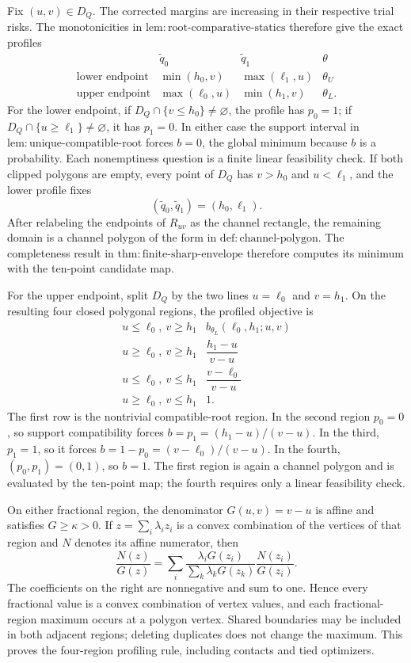 Fix \((u,v)\in D_Q\). The corrected margins are increasing in their respective trial risks. The monotonicities in \(\mathrm{lem:root\text{-}comparative\text{-}statics}\) therefore give the exact profiles
\[
\begin{array}{c|ccc}
&\widetilde q_0&\widetilde q_1&\theta\\ \hline
\text{lower endpoint}&\min(h_0,v)&\max(\ell_1,u)&\theta_U\\
\text{upper endpoint}&\max(\ell_0,u)&\min(h_1,v)&\theta_L.
\end{array}
\]
For the lower endpoint, if \(D_Q\cap\{v\leq h_0\}\neq\varnothing\), the profile has \(p_0=1\); if \(D_Q\cap\{u\geq\ell_1\}\neq\varnothing\), it has \(p_1=0\). In either case the support interval in \(\mathrm{lem:unique\text{-}compatible\text{-}root}\) forces \(b=0\), the global minimum because \(b\) is a probability. Each nonemptiness question is a finite linear feasibility check. If both clipped polygons are empty, every point of \(D_Q\) has \(v>h_0\) and \(u<\ell_1\), and the lower profile fixes
\[
(\widetilde q_0,\widetilde q_1)=(h_0,\ell_1).
\]
After relabeling the endpoints of \(R_{uv}\) as the channel rectangle, the remaining domain is a channel polygon of the form in \(\mathrm{def:channel\text{-}polygon}\). The completeness result in \(\mathrm{thm:finite\text{-}sharp\text{-}envelope}\) therefore computes its minimum with the ten-point candidate map.

For the upper endpoint, split \(D_Q\) by the two lines \(u=\ell_0\) and \(v=h_1\). On the resulting four closed polygonal regions, the profiled objective is
\[
\begin{array}{c|c}
u\leq\ell_0,\ v\geq h_1
&b_{\theta_L}(\ell_0,h_1;u,v)\\
u\geq\ell_0,\ v\geq h_1
&\dfrac{h_1-u}{v-u}\\
u\leq\ell_0,\ v\leq h_1
&\dfrac{v-\ell_0}{v-u}\\
u\geq\ell_0,\ v\leq h_1
&1.
\end{array}
\]
The first row is the nontrivial compatible-root region. In the second region \(p_0=0\), so support compatibility forces \(b=p_1=(h_1-u)/(v-u)\). In the third, \(p_1=1\), so it forces \(b=1-p_0=(v-\ell_0)/(v-u)\). In the fourth, \((p_0,p_1)=(0,1)\), so \(b=1\). The first region is again a channel polygon and is evaluated by the ten-point map; the fourth requires only a linear feasibility check.

On either fractional region, the denominator \(G(u,v)=v-u\) is affine and satisfies \(G\geq\kappa>0\). If \(z=\sum_i\lambda_i z_i\) is a convex combination of the vertices of that region and \(N\) denotes its affine numerator, then
\[
\frac{N(z)}{G(z)}
=\sum_i
\frac{\lambda_iG(z_i)}{\sum_k\lambda_kG(z_k)}
\frac{N(z_i)}{G(z_i)}.
\]
The coefficients on the right are nonnegative and sum to one. Hence every fractional value is a convex combination of vertex values, and each fractional-region maximum occurs at a polygon vertex. Shared boundaries may be included in both adjacent regions; deleting duplicates does not change the maximum. This proves the four-region profiling rule, including contacts and tied optimizers.

